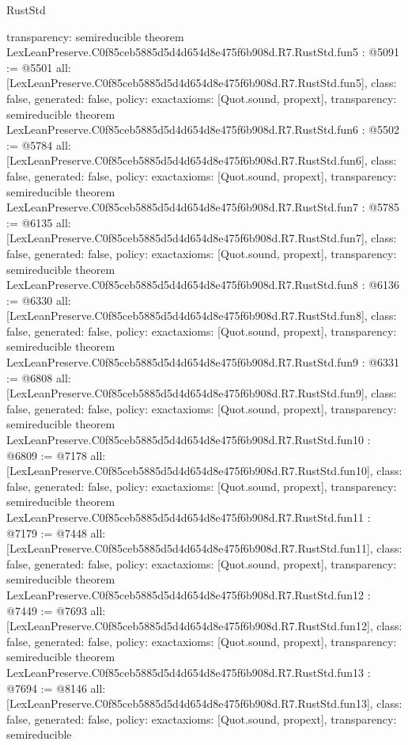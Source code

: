 \begin{lexlean}{RustStd}
\begin{coremodule}
{  transparency: semireducible
}
theorem LexLeanPreserve.C0f85ceb5885d5d4d654d8e475f6b908d.R7.RustStd.fun5 : @5091 := @5501 {
  all: [LexLeanPreserve.C0f85ceb5885d5d4d654d8e475f6b908d.R7.RustStd.fun5],
  class: false,
  generated: false,
  policy: exact{axioms: [Quot.sound, propext]},
  transparency: semireducible
}
theorem LexLeanPreserve.C0f85ceb5885d5d4d654d8e475f6b908d.R7.RustStd.fun6 : @5502 := @5784 {
  all: [LexLeanPreserve.C0f85ceb5885d5d4d654d8e475f6b908d.R7.RustStd.fun6],
  class: false,
  generated: false,
  policy: exact{axioms: [Quot.sound, propext]},
  transparency: semireducible
}
theorem LexLeanPreserve.C0f85ceb5885d5d4d654d8e475f6b908d.R7.RustStd.fun7 : @5785 := @6135 {
  all: [LexLeanPreserve.C0f85ceb5885d5d4d654d8e475f6b908d.R7.RustStd.fun7],
  class: false,
  generated: false,
  policy: exact{axioms: [Quot.sound, propext]},
  transparency: semireducible
}
theorem LexLeanPreserve.C0f85ceb5885d5d4d654d8e475f6b908d.R7.RustStd.fun8 : @6136 := @6330 {
  all: [LexLeanPreserve.C0f85ceb5885d5d4d654d8e475f6b908d.R7.RustStd.fun8],
  class: false,
  generated: false,
  policy: exact{axioms: [Quot.sound, propext]},
  transparency: semireducible
}
theorem LexLeanPreserve.C0f85ceb5885d5d4d654d8e475f6b908d.R7.RustStd.fun9 : @6331 := @6808 {
  all: [LexLeanPreserve.C0f85ceb5885d5d4d654d8e475f6b908d.R7.RustStd.fun9],
  class: false,
  generated: false,
  policy: exact{axioms: [Quot.sound, propext]},
  transparency: semireducible
}
theorem LexLeanPreserve.C0f85ceb5885d5d4d654d8e475f6b908d.R7.RustStd.fun10 : @6809 := @7178 {
  all: [LexLeanPreserve.C0f85ceb5885d5d4d654d8e475f6b908d.R7.RustStd.fun10],
  class: false,
  generated: false,
  policy: exact{axioms: [Quot.sound, propext]},
  transparency: semireducible
}
theorem LexLeanPreserve.C0f85ceb5885d5d4d654d8e475f6b908d.R7.RustStd.fun11 : @7179 := @7448 {
  all: [LexLeanPreserve.C0f85ceb5885d5d4d654d8e475f6b908d.R7.RustStd.fun11],
  class: false,
  generated: false,
  policy: exact{axioms: [Quot.sound, propext]},
  transparency: semireducible
}
theorem LexLeanPreserve.C0f85ceb5885d5d4d654d8e475f6b908d.R7.RustStd.fun12 : @7449 := @7693 {
  all: [LexLeanPreserve.C0f85ceb5885d5d4d654d8e475f6b908d.R7.RustStd.fun12],
  class: false,
  generated: false,
  policy: exact{axioms: [Quot.sound, propext]},
  transparency: semireducible
}
theorem LexLeanPreserve.C0f85ceb5885d5d4d654d8e475f6b908d.R7.RustStd.fun13 : @7694 := @8146 {
  all: [LexLeanPreserve.C0f85ceb5885d5d4d654d8e475f6b908d.R7.RustStd.fun13],
  class: false,
  generated: false,
  policy: exact{axioms: [Quot.sound, propext]},
  transparency: semireducible
}
\end{coremodule}
\end{lexlean}
